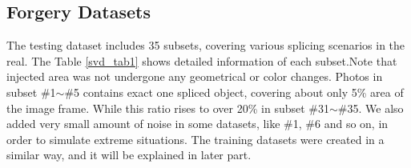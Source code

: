 \documentclass[a4paper, 12pt, twoside]{report}
\begin{document}
\subsection{Forgery Datasets}
\lipsum[1]

The testing dataset includes 35 subsets, covering various splicing scenarios in the real. The Table \ref{svd_tab1} shows detailed information of each subset.Note that injected area was not undergone any geometrical or color changes. Photos in subset \#1$\sim$\#5 contains exact one spliced object, covering about only 5\% area of the image frame. While this ratio rises to over 20\% in subset \#31$\sim$\#35. We also added very small amount of noise in some datasets, like \#1, \#6 and so on, in order to simulate extreme situations. The training datasets were created in a similar way, and it will be explained in later part.
\end{document}
